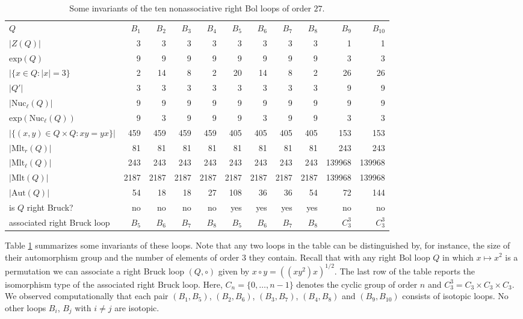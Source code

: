 \documentclass[12pt,reqno]{amsart}
\numberwithin{equation}{section}
\theoremstyle{plain}
\theoremstyle{definition}
\newcommand{\exponent}[1]{\mathrm{exp}(#1)}
\newcommand{\aut}[1]{\mathrm{Aut}(#1)}
\newcommand{\mlt}[1]{\mathrm{Mlt}(#1)}
\newcommand{\rmlt}[1]{\mathrm{Mlt}_r(#1)}
\newcommand{\lmlt}[1]{\mathrm{Mlt}_\ell(#1)}
\newcommand{\lnuc}[1]{\mathrm{Nuc}_\ell(#1)}
\newcommand{\Z}{C}
\begin{document}
\begin{table}
\begin{footnotesize}
\begin{tabular}{lrrrrrrrrrr}
\toprule
$Q$                                 	&$B_1$ 	&$B_2$	&$B_3$ 	&$B_4$	&$B_5$	&$B_6$	&$B_7$	&$B_8$	&$B_9$	  &$B_{10}$\\
$|Z(Q)|$						        &3		&3     	&3		&3		&3		&3		&3		&3		&1		  &1\\					
$\exponent{Q}$                          &9      &9      &9      &9     	&9     	&9      &9     	&9     	&3		  &3\\
$|\{x\in Q:|x|=3\}$                     &2      &14     &8   	&2     	&20  	&14 	&8		&2		&26		  &26\\
$|Q'|$                              	&3      &3      &3    	&3		&3		&3		&3		&3		&9		  &9\\
$|\lnuc{Q}|$                       	    &9    	&9		&9		&9		&9		&9		&9		&9		&9		  &9\\
$\exponent{\lnuc{Q}}$                   &9		&3		&9		&9		&9		&3		&9		&9		&3		  &3\\
$|\{(x,y)\in Q\times Q:xy=yx\}|$        &459	&459	&459	&459   	&405	&405	&405	&405	&153	  &153\\
$|\rmlt{Q}|$                        	&81		&81		&81		&81		&81		&81		&81		&81		&243	  &243\\
$|\lmlt{Q}|$                        	&243    &243	&243	&243	&243	&243	&243	&243	&139968   &139968\\
$|\mlt{Q}|$                         	&2187	&2187	&2187	&2187	&2187	&2187	&2187	&2187	&139968   &139968\\
$|\aut{Q}|$                         	&54     &18		&18		&27		&108	&36		&36		&54		&72		  &144\\
is $Q$ right Bruck?                	    &no     &no     &no     &no     &yes    &yes    &yes    &yes    &no       &no\\
associated right Bruck loop             &$B_5$  &$B_6$  &$B_7$  &$B_8$  &$B_5$  &$B_6$  &$B_7$  &$B_8$  &$\Z_3^3$ &$\Z_3^3$\\
\bottomrule
\end{tabular}
\end{footnotesize}
\medskip
\caption{Some invariants of the ten nonassociative right Bol loops of order $27$.}\label{Tb:Invariants}
\end{table}

Table \ref{Tb:Invariants} summarizes some invariants of these loops. Note that any two loops in the table can be distinguished by, for instance, the size of their automorphism group and the number of elements of order $3$ they contain. Recall that with any right Bol loop $Q$ in which $x\mapsto x^2$ is a permutation we can associate a right Bruck loop $(Q,\circ)$ given by $x\circ y = ((xy^2)x)^{1/2}$. The last row of the table reports the isomorphism type of the associated right Bruck loop. Here, $\Z_n=\{0,\dots,n-1\}$ denotes the cyclic group of order $n$ and $\Z_3^3=\Z_3\times\Z_3\times\Z_3$. We observed computationally that each pair $(B_1,B_5)$, $(B_2,B_6)$, $(B_3,B_7)$, $(B_4,B_8)$ and $(B_9,B_{10})$ consists of isotopic loops. No other loops $B_i$, $B_j$ with $i\ne j$ are isotopic.
\end{document}
